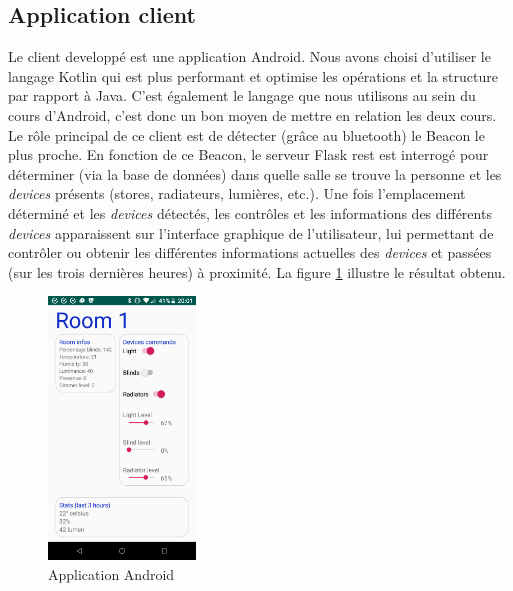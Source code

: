 \subsection{Application client}
Le client developpé est une application Android. Nous avons choisi d'utiliser le langage Kotlin qui est plus performant et optimise les opérations et la structure par rapport à Java. C'est également le langage que nous utilisons au sein du cours d'Android, c'est donc un bon moyen de mettre en relation les deux cours.
Le rôle principal de ce client est de détecter (grâce au bluetooth) le Beacon le plus proche. En fonction de ce Beacon, le serveur Flask \acrshort{rest} est interrogé pour déterminer (via la base de données) dans quelle salle se trouve la personne et les \textit{\textit{devices}} présents (stores, radiateurs, lumières, etc.). Une fois l'emplacement déterminé et les \textit{\textit{devices}} détectés, les contrôles et les informations des différents \textit{\textit{devices}} apparaissent sur l'interface graphique de l'utilisateur, lui permettant de contrôler ou obtenir les différentes informations actuelles des \textit{\textit{devices}} et passées (sur les trois dernières heures) à proximité. La figure \ref{app_android} illustre le résultat obtenu.
\begin{figure}
    \begin{center}
        \includegraphics[width=0.35\textwidth]{img/app.png}
    \end{center}
    \caption{Application Android}
    \label{app_android}
\end{figure}

